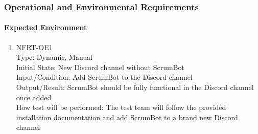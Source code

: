 \documentclass[12pt, titlepage]{article}
\begin{document}
\subsubsection{Operational and Environmental Requirements}
\paragraph{Expected Environment}
\begin{enumerate}

\item{NFRT-OE1}\\
Type: Dynamic, Manual\\
Initial State: New Discord channel without ScrumBot\\
Input/Condition: Add ScrumBot to the Discord channel\\
Output/Result: ScrumBot should be fully functional in the Discord channel once added\\
How test will be performed: The test team will follow the provided installation documentation and add ScrumBot to a brand new Discord channel
\end{enumerate}
\end{document}
